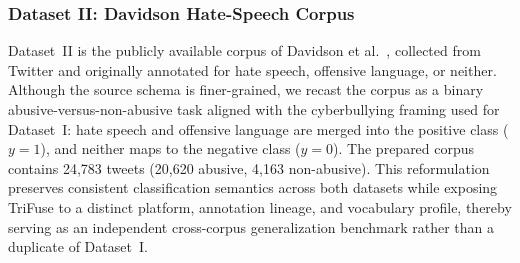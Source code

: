 \subsubsection{Dataset II: Davidson Hate-Speech Corpus}
Dataset~II is the publicly available corpus of Davidson et al.\ \cite{ref11}, collected from Twitter and originally annotated for hate speech, offensive language, or neither. Although the source schema is finer-grained, we recast the corpus as a binary abusive-versus-non-abusive task aligned with the cyberbullying framing used for Dataset~I: hate speech and offensive language are merged into the positive class ($y=1$), and neither maps to the negative class ($y=0$). The prepared corpus contains 24{,}783 tweets (20{,}620 abusive, 4{,}163 non-abusive). This reformulation preserves consistent classification semantics across both datasets while exposing TriFuse to a distinct platform, annotation lineage, and vocabulary profile, thereby serving as an independent cross-corpus generalization benchmark rather than a duplicate of Dataset~I.

\begin{table}[!t]
\caption{Dataset Examples (Dataset~I)}
\label{tab:dataset_examples}
\centering
{}
\end{table}

\begin{table}[!t]
\caption{Dataset Characteristics}
\label{tab:dataset_summary}
\centering
{}
\end{table}

